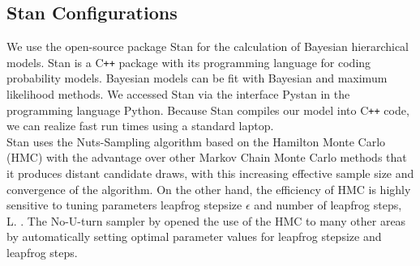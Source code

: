 \subsection{Stan Configurations}
We use the open-source package Stan for the calculation of Bayesian hierarchical models. Stan is a C\texttt{++} package with its programming language for coding probability models. Bayesian models can be fit with Bayesian and maximum likelihood methods. We accessed Stan via the interface Pystan in the programming language Python. Because Stan compiles our model into C\texttt{++} code, we can realize fast run times using a standard laptop.\\
Stan uses the Nuts-Sampling algorithm based on the Hamilton Monte Carlo (HMC) with the advantage over other Markov Chain Monte Carlo methods that it produces distant candidate draws, with this increasing effective sample size and convergence of the algorithm.
On the other hand, the efficiency of HMC is highly sensitive to tuning parameters leapfrog stepsize $\epsilon$ and number of leapfrog steps, L. \cite{neal2011}. %
The No-U-turn sampler by \cite{hoffman2014} opened the use of the HMC to many other areas by automatically setting optimal parameter values for leapfrog stepsize and leapfrog steps. \\
